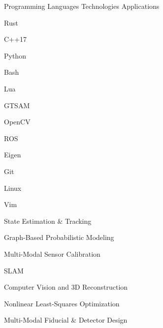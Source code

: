 
\begin{cventries}

  \cventrycol
  {Programming Languages}
  {Technologies}
  {Applications}
  {
    \begin{cvitems}
      \item {Rust}
      \item {C++17}
      \item {Python}
      \item {Bash}
      \item {Lua}
    \end{cvitems}
  }
  {
    \begin{cvitems}
      \item {GTSAM}
      \item {OpenCV}
      \item {ROS}
      \item {Eigen}
      \item {Git}
      \item {Linux}
      \item {Vim}
    \end{cvitems}
  }
  {
    \begin{cvitems}
      \item {State Estimation \& Tracking}
      \item {Graph-Based Probabilistic Modeling}
      \item {Multi-Modal Sensor Calibration}
      \item {SLAM}
      \item {Computer Vision and 3D Reconstruction}
      \item {Nonlinear Least-Squares Optimization}
      \item {Multi-Modal Fiducial \& Detector Design}
    \end{cvitems}
  }

\end{cventries}
